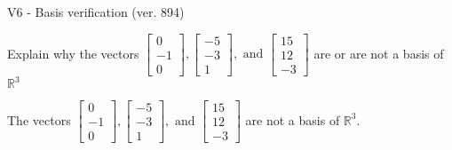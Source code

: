 \begin{exercise}
  \begin{exerciseTitle}V6 - Basis verification (ver. 894)\end{exerciseTitle}
  \begin{exerciseStatement}
    Explain why the vectors \(\left[\begin{array}{r}
0 \\
-1 \\
0
\end{array}\right] , \left[\begin{array}{r}
-5 \\
-3 \\
1
\end{array}\right] , \text{ and } \left[\begin{array}{r}
15 \\
12 \\
-3
\end{array}\right]\) are or are not a basis of \(\mathbb{R}^3\)	


  \end{exerciseStatement}
  \begin{exerciseAnswer}
   The vectors \(\left[\begin{array}{r}
0 \\
-1 \\
0
\end{array}\right] , \left[\begin{array}{r}
-5 \\
-3 \\
1
\end{array}\right] , \text{ and } \left[\begin{array}{r}
15 \\
12 \\
-3
\end{array}\right]\) 
  	 are not  a basis of \(\mathbb{R}^3\).
  


  \end{exerciseAnswer}
\end{exercise}